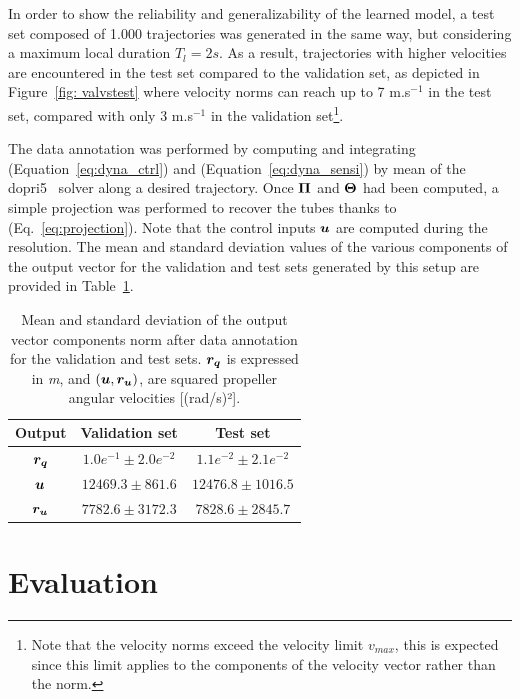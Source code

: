 In order to show the reliability and generalizability of the learned model, a test set composed of 1.000 trajectories was generated in the same way, but considering a maximum local duration $T_l = 2s$.
As a result, trajectories with higher velocities are encountered in the test set compared to the validation set, as depicted in Figure~\ref{fig: valvstest} where velocity norms can reach up to 7 m.s$^{-1}$ in the test set, compared with only 3 m.s$^{-1}$ in the validation set\footnote{Note that the velocity norms exceed the velocity limit $v_{max}$, this is expected since this limit applies to the components of the velocity vector rather than the norm.}.

The data annotation was performed by computing and integrating (Equation~\ref{eq:dyna_ctrl}) and (Equation~\ref{eq:dyna_sensi}) by mean of the dopri5~\cite{cdopri5}  solver along a desired trajectory. 
Once $\boldsymbol{\Pi}$ and $\boldsymbol{\Theta}$ had been computed, a simple projection was performed to recover the tubes thanks to (Eq.~\ref{eq:projection}).
Note that the control inputs $\boldsymbol{u}$ are computed during the  resolution.
The mean and standard deviation values of the various components of the output vector for the validation and test sets generated by this setup are provided in Table~\ref{tab:datas_stats}.

\begin{table}[h]
\centering
\begin{tabular}{ | c | c || c |}
\hline
  \textbf{Output}  & \textbf{Validation set}  & \textbf{Test set} \\ \hline
$\boldsymbol{r_q}$ & $1.0e^{-1} \pm 2.0e^{-2}$ & $1.1e^{-2} \pm 2.1e^{-2}$ \\ \hline
$\boldsymbol{u}$ & $12469.3 \pm 861.6$ & $12476.8 \pm 1016.5$ \\ \hline
$\boldsymbol{r_u}$ & $7782.6 \pm 3172.3$ & $7828.6 \pm 2845.7$ \\ \hline
    
\end{tabular}
\caption{
Mean and standard deviation of the output vector components norm after data annotation for the validation and test sets.
$\boldsymbol{r_q}$ is expressed in \emph{m}, and $(\boldsymbol{u}, \boldsymbol{r_u})$, are squared propeller angular velocities [(rad/s)²].}
 \label{tab:datas_stats}
\end{table}

\section{Evaluation}

